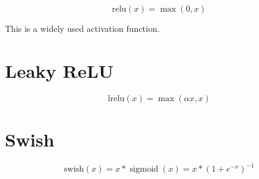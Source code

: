 \begin{equation}
  \label{eq:15}  
  \text{relu}(x)=\max (0, x)
\end{equation}

This is a widely used activation function.


\section{Leaky ReLU}
\label{sec:leaky-relu}

\begin{equation}
  \label{eq:16}
  \text{lrelu}(x)=\max (\alpha x, x)
\end{equation}


\section{Swish}
\label{sec:swish}

\begin{equation}
  \label{eq:17}
  \text{swish}(x)  = x * \operatorname{sigmoid}(x)  =x *(1+e^{-x})^{-1}
\end{equation}
